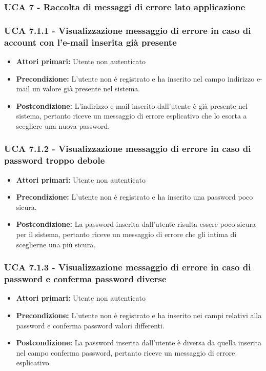 \subsubsection{UCA 7 - Raccolta di messaggi di errore lato applicazione}
\subsubsection{UCA 7.1.1 - Visualizzazione messaggio di errore in caso di account con l'e-mail inserita già presente}%
\begin{itemize}
\item \textbf{Attori primari:} Utente non autenticato
\item \textbf{Precondizione:} L'utente non è registrato e ha inserito nel campo indirizzo e-mail un valore già presente nel sistema.
\item \textbf{Postcondizione:} L'indirizzo e-mail inserito dall'utente è già presente nel sistema, pertanto riceve un messaggio di errore esplicativo che lo esorta a scegliere una nuova password.
\end{itemize}

\subsubsection{UCA 7.1.2 - Visualizzazione messaggio di errore in caso di password troppo debole}%
\begin{itemize}
\item \textbf{Attori primari:} Utente non autenticato
\item \textbf{Precondizione:} L'utente non è registrato e ha inserito una password poco sicura.
\item \textbf{Postcondizione:} La password inserita dall'utente risulta essere poco sicura per il sistema, pertanto riceve un messaggio di errore che gli intima di sceglierne una più sicura.
\end{itemize}


\subsubsection{UCA 7.1.3 - Visualizzazione messaggio di errore in caso di password e conferma password diverse}%
\begin{itemize}
\item \textbf{Attori primari:} Utente non autenticato
\item \textbf{Precondizione:} L'utente non è registrato e ha inserito nei campi relativi alla password e conferma password valori differenti.
\item \textbf{Postcondizione:} La password inserita dall'utente è diversa da quella inserita nel campo conferma password, pertanto riceve un messaggio di errore esplicativo.
\end{itemize}

